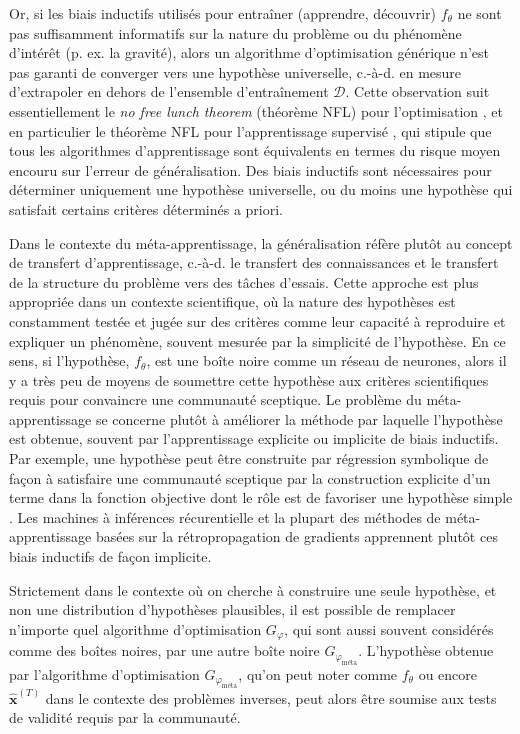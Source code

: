 Or, si les biais inductifs utilisés pour entraîner (apprendre, découvrir) $f_{\theta}$ ne sont pas suffisamment 
informatifs sur la nature du problème ou du phénomène d'intérêt (p. ex. la gravité), 
alors un algorithme d'optimisation générique n'est pas garanti de converger vers 
une hypothèse universelle, c.-à-d. en mesure d'extrapoler en dehors de l'ensemble 
d'entraînement $\mathcal{D}$.
Cette observation suit essentiellement le \textit{no free lunch theorem} (théorème NFL) pour 
l'optimisation \citep{Wolpert1997}, et en particulier 
le théorème NFL pour l'apprentissage supervisé \citep{Wolpert1992,Wolpert1996}, qui stipule que tous les 
algorithmes d'apprentissage %
sont équivalents en termes du risque moyen encouru sur l'erreur de généralisation. 
Des biais inductifs sont nécessaires pour déterminer uniquement une hypothèse universelle, 
ou du moins une hypothèse qui satisfait certains critères déterminés a priori.

Dans le contexte du méta-apprentissage, la généralisation réfère plutôt au concept de transfert d'apprentissage, c.-à-d. le transfert des connaissances 
et le transfert de la structure du problème vers des tâches d'essais. 
Cette approche est plus appropriée dans un contexte scientifique, où la nature des hypothèses est 
constamment testée et jugée sur des critères comme leur capacité à reproduire et expliquer un phénomène, souvent mesurée par 
la simplicité de l'hypothèse. En ce sens, 
si l'hypothèse, $f_\theta$, est une boîte noire comme un réseau de neurones, alors il y a très peu de moyens de soumettre 
cette hypothèse aux critères scientifiques requis pour convaincre une communauté sceptique. 
Le problème du méta-apprentissage se concerne plutôt à améliorer la méthode par laquelle l'hypothèse est obtenue, 
souvent par l'apprentissage explicite ou implicite de biais inductifs. 
Par exemple, une hypothèse peut être construite par régression symbolique 
de façon à satisfaire une communauté sceptique par la construction explicite 
d'un terme dans la fonction objective dont le rôle est de favoriser une hypothèse simple \citep[e.g.][]{Lemos2022}.
Les machines à inférences récurentielle et la plupart des méthodes de méta-apprentissage basées sur la 
rétropropagation de gradients \citep[e.g.][]{Finn2017} apprennent plutôt ces biais inductifs de façon implicite.

Strictement dans le contexte où on cherche à construire une seule hypothèse, et non une distribution d'hypothèses 
plausibles, il est possible de remplacer n'importe quel algorithme d'optimisation $G_\varphi$, qui sont aussi souvent considérés 
comme des boîtes noires, par une autre boîte noire $G_{\varphi_{\text{méta}}}$. L'hypothèse obtenue par 
l'algorithme d'optimisation $G_{\varphi_{\text{méta}}}$, qu'on peut noter comme $f_\theta$ ou encore $\hat{\mathbf{x}}^{(T)}$ 
dans le contexte des problèmes inverses, peut alors être soumise aux tests de validité
requis par la communauté. 

